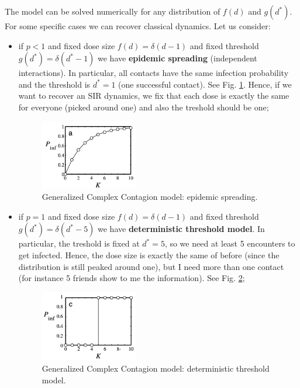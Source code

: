 \documentclass[../main/main.tex]{subfiles}
\begin{document}
The model can be solved numerically for any distribution of $f(d)$ and $g(d^*)$.
For some specific cases we can recover classical dynamics. Let us consider:
\begin{itemize}

\item if \( p<1 \)  and fixed dose size $f(d) = \delta(d-1)$ and fixed threshold $g(d^*) = \delta(d^*-1)$ we have \textbf{epidemic spreading} (independent interactions). In particular, all contacts have the same infection probability and the threshold is $d^* = 1$ (one successful contact). See Fig. \ref{fig:11_1}.
Hence, if we want to recover an SIR dynamics, we fix that each dose is exactly the same for everyone (picked around one) and also the treshold should be one;

\begin{figure}[h!]
\centering
\includegraphics[width=0.4\textwidth]{../lessons/image/11/1.png}
\caption{\label{fig:11_1} Generalized Complex Contagion model: epidemic spreading.}
\end{figure}


\item if \( p=1 \)  and fixed dose size $f(d) = \delta(d-1)$ and fixed threshold $g(d^*) = \delta(d^*-5)$ we have \textbf{deterministic threshold model}. In particular, the treshold is fixed at \( d^*=5 \), so we need at least 5 encounters to get infected. Hence, the dose size is exactly the same of before (since the distribution is still peaked around one), but I need more than one contact (for instance 5 friends show to me the information). See Fig. \ref{fig:11_2};

\begin{figure}[h!]
\centering
\includegraphics[width=0.4\textwidth]{../lessons/image/11/2.png}
\caption{\label{fig:11_2} Generalized Complex Contagion model: deterministic threshold model.}
\end{figure}


\end{itemize}
\end{document}
